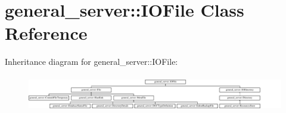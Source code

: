 \hypertarget{classgeneral__server_1_1IOFile}{\section{general\-\_\-server\-:\-:\-I\-O\-File \-Class \-Reference}
\label{classgeneral__server_1_1IOFile}
}
\-Inheritance diagram for general\-\_\-server\-:\-:\-I\-O\-File\-:\begin{figure}[H]
\begin{center}
\leavevmode
\includegraphics[height=1.588652cm]{classgeneral__server_1_1IOFile}
\end{center}
\end{figure}
